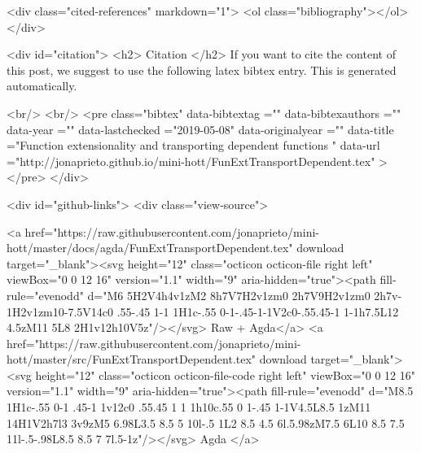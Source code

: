   <div class="cited-references" markdown="1">
  <ol class="bibliography"></ol>
  </div>


  
  <div id="citation">
  <h2> Citation </h2>
  If you want to cite the content of this post,
  we suggest to use the following latex bibtex entry.
  This is generated automatically.

  <br/>
  <br/>
  <pre class="bibtex"
       data-bibtextag =""
       data-bibtexauthors =""
       data-year =""
       data-lastchecked ="2019-05-08"
       data-originalyear =""
       data-title ="Function extensionality and transporting dependent functions "
       data-url ="http://jonaprieto.github.io/mini-hott/FunExtTransportDependent.tex"
  ></pre>
  </div>
  

  <div id="github-links">
    <div class="view-source">
      
        <a href="https://raw.githubusercontent.com/jonaprieto/mini-hott/master/docs/agda/FunExtTransportDependent.tex" download target="_blank"><svg height="12" class="octicon octicon-file right left" viewBox="0 0 12 16" version="1.1" width="9" aria-hidden="true"><path fill-rule="evenodd" d="M6 5H2V4h4v1zM2 8h7V7H2v1zm0 2h7V9H2v1zm0 2h7v-1H2v1zm10-7.5V14c0 .55-.45 1-1 1H1c-.55 0-1-.45-1-1V2c0-.55.45-1 1-1h7.5L12 4.5zM11 5L8 2H1v12h10V5z"/></svg> Raw + Agda</a>
        <a href="https://raw.githubusercontent.com/jonaprieto/mini-hott/master/src/FunExtTransportDependent.tex" download target="_blank"><svg height="12" class="octicon octicon-file-code right left" viewBox="0 0 12 16" version="1.1" width="9" aria-hidden="true"><path fill-rule="evenodd" d="M8.5 1H1c-.55 0-1 .45-1 1v12c0 .55.45 1 1 1h10c.55 0 1-.45 1-1V4.5L8.5 1zM11 14H1V2h7l3 3v9zM5 6.98L3.5 8.5 5 10l-.5 1L2 8.5 4.5 6l.5.98zM7.5 6L10 8.5 7.5 11l-.5-.98L8.5 8.5 7 7l.5-1z"/></svg> Agda </a>
      
